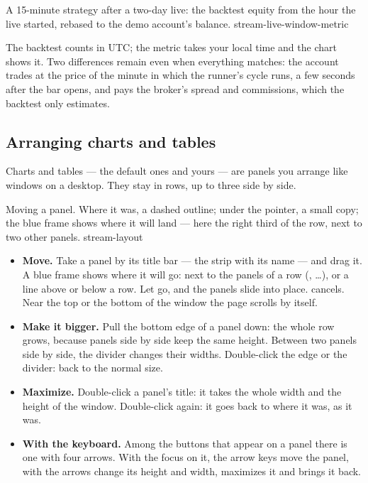  {A 15-minute strategy after a two-day live: the backtest equity from the
   hour the live started, rebased to the demo account's balance.}
  {stream-live-window-metric}

\noindent
The backtest counts in UTC; the metric takes your local time and the chart
shows it.
Two differences remain even when everything matches: the account trades at
the price of the minute in which the runner's cycle runs, a few seconds
after the bar opens, and pays the broker's spread and commissions, which the
backtest only estimates.

\subsection{Arranging charts and tables}\label{sez:stream-layout}

Charts and tables --- the default ones and yours --- are panels you arrange
like windows on a desktop. They stay in rows, up to three side by side.

  {Moving a panel. Where it was, a dashed outline; under the pointer, a small
   copy; the blue frame shows where it will land --- here the right third of
   the row, next to two other panels.}
  {stream-layout}

\begin{itemize}
  \item \textbf{Move.} Take a panel by its title bar --- the strip with its
    name --- and drag it. A blue frame shows where it will go: next to the
    panels of a row (, \ldots), or a
    line  above or below a row. Let go, and the panels slide
    into place.  cancels. Near the top or the bottom of the window
    the page scrolls by itself.
  \item \textbf{Make it bigger.} Pull the bottom edge of a panel down: the
    whole row grows, because panels side by side keep the same height.
    Between two panels side by side, the divider changes their widths.
    Double-click the edge or the divider: back to the normal size.
  \item \textbf{Maximize.} Double-click a panel's title: it takes the whole
    width and the height of the window. Double-click again: it goes back to
    where it was, as it was.
  \item \textbf{With the keyboard.} Among the buttons that appear on a
    panel there is one with four arrows. With the focus on it, the arrow keys
    move the panel,  with the arrows change its height and width,
     maximizes it and brings it back.
\end{itemize}

